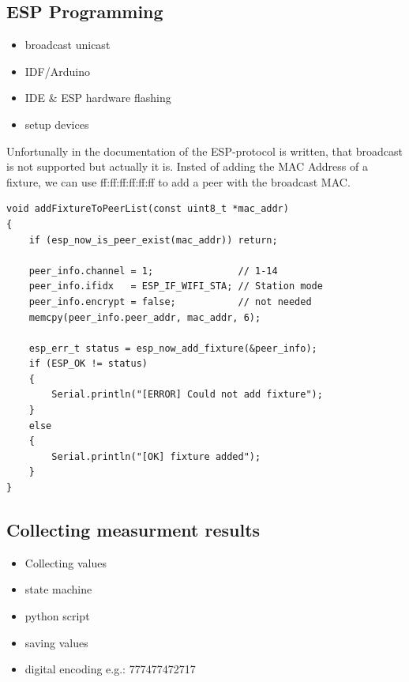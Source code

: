 \documentclass[]{ccs-thesis}
\begin{document}
\subsection{ESP Programming}
\begin{itemize}
\item broadcast unicast
\item IDF/Arduino
\item IDE \& ESP hardware flashing
\item setup devices
\end{itemize}
Unfortunally in the documentation of the ESP-protocol is written, that broadcast is not supported 
but actually it is. Insted of adding the \ac{MAC} Address of a fixture, we can use 
 ff:ff:ff:ff:ff:ff 
to add a peer with the broadcast \ac{MAC}.

\label{lst:shorttable}
\begin{lstlisting}
void addFixtureToPeerList(const uint8_t *mac_addr) 
{
	if (esp_now_is_peer_exist(mac_addr)) return;

	peer_info.channel = 1;               // 1-14
	peer_info.ifidx   = ESP_IF_WIFI_STA; // Station mode
	peer_info.encrypt = false;         	 // not needed
	memcpy(peer_info.peer_addr, mac_addr, 6);

	esp_err_t status = esp_now_add_fixture(&peer_info);
	if (ESP_OK != status) 
	{
		Serial.println("[ERROR] Could not add fixture");
	}
	else 
	{
		Serial.println("[OK] fixture added");
	}
}
\end{lstlisting}
% 


\subsection{Collecting measurment results}
\begin{itemize}
\item Collecting values
\item state machine
\item python script
\item saving values
\item digital encoding e.g.: 777477472717
\end{itemize}
\end{document}
